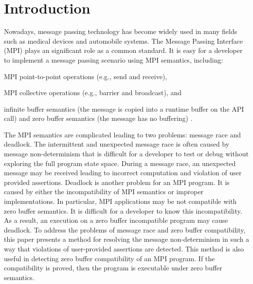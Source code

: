 \section{Introduction}
Nowadays, message passing technology has become widely used in many fields such as medical devices and automobile systems. The Message Passing Interface (MPI) plays an significant role as a common standard. It is easy for a developer to implement a message passing scenario using MPI semantics, including:

\begin{compactitem}
\item MPI point-to-point operations (e.g., send and receive),
\item MPI collective operations (e.g., barrier and broadcast), and
\item infinite buffer semantics (the message is copied into a runtime buffer on the API call) and zero buffer semantics (the message has no buffering) \cite{DBLP:conf/fm/VakkalankaVGK09}.
\end{compactitem}

The MPI semantics are complicated leading to two problems: message race and deadlock. The intermittent and unexpected message race is often caused by message non-determinism that is difficult for a developer to test or debug without exploring the full program state space. During a message race, an unexpected message may be received leading to incorrect computation and violation of user provided assertions. Deadlock is another problem for an MPI program. It is caused by either the incompatibility of MPI semantics or improper implementations. In particular, MPI applications may be not compatible with zero buffer semantics. It is difficult for a developer to know this incompatibility. As a result, an execution on a zero buffer incompatible program may cause deadlock. To address the problems of message race and zero buffer compatibility, this paper presents a method for resolving the message non-determinism in such a way that violations of user-provided assertions are detected. This method is also useful in detecting zero buffer compatibility of an MPI program. If the compatibility is proved, then the program is executable under zero buffer semantics. 

